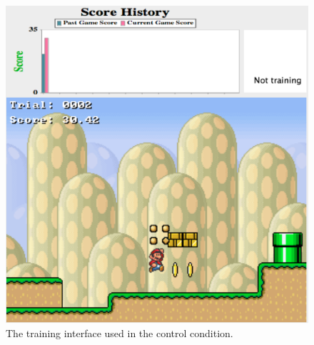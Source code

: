 \begin{figure}[htb]
\centering
\includegraphics[width=0.45\linewidth]{control} %
\caption{The training interface used in the control condition. }%
\label{control}
\end{figure}


